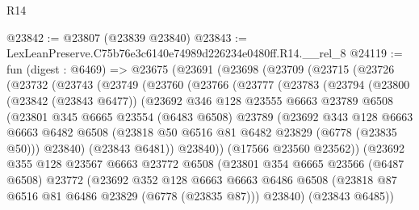 \begin{lexlean}{R14}
\begin{coremodule}
@23842 := @23807 (@23839 @23840)
@23843 := LexLeanPreserve.C75b76e3c6140e74989d226234e0480ff.R14.__rel_8
@24119 := fun (digest : @6469) =>
  @23675
    (@23691
      (@23698
        (@23709
          (@23715
            (@23726
              (@23732
                (@23743
                  (@23749
                    (@23760
                      (@23766
                        (@23777
                          (@23783
                            (@23794
                              (@23800
                                (@23842 (@23843 @6477))
                                (@23692
                                  @346
                                  @128
                                  @23555
                                  @6663
                                  @23789
                                  @6508
                                  (@23801
                                    @345
                                    @6665
                                    @23554
                                    (@6483 @6508)
                                    @23789
                                    (@23692
                                      @343
                                      @128
                                      @6663
                                      @6663
                                      @6482
                                      @6508
                                      (@23818 @50 @6516 @81 @6482 @23829 (@6778 (@23835 @50)))
                                      @23840)
                                    (@23843 @6481))
                                  @23840))
                              (@17566 @23560 @23562))
                            (@23692
                              @355
                              @128
                              @23567
                              @6663
                              @23772
                              @6508
                              (@23801
                                @354
                                @6665
                                @23566
                                (@6487 @6508)
                                @23772
                                (@23692
                                  @352
                                  @128
                                  @6663
                                  @6663
                                  @6486
                                  @6508
                                  (@23818 @87 @6516 @81 @6486 @23829 (@6778 (@23835 @87)))
                                  @23840)
                                (@23843 @6485))

\end{coremodule}
\end{lexlean}
